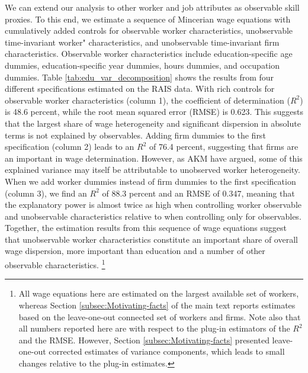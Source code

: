 We can extend our analysis to other worker and job attributes as observable skill proxies. To this end, we estimate a sequence of Mincerian wage equations with cumulatively added controls for observable worker characteristics, unobservable time-invariant worker" characteristics, and unobservable time-invariant firm characteristics. Observable worker characteristics include education-specific age dummies, education-specific year dummies, hours dummies, and occupation dummies. Table \ref{tab:edu_var_decomposition} shows the results from four different specifications estimated on the RAIS data. With rich controls for observable worker characteristics (column 1), the coefficient of determination ($R^2$) is 48.6 percent, while the root mean squared error (RMSE) is 0.623. This suggests that the largest share of wage heterogeneity and significant dispersion in absolute terms is not explained by observables. Adding firm dummies to the first specification (column 2) leads to an $R^2$ of 76.4 percent, suggesting that firms are an important in wage determination. However, as AKM have argued, some of this explained variance may itself be attributable to unobserved worker heterogeneity. When we add worker dummies instead of firm dummies to the first specification (column 3), we find an $R^2$ of 88.3 percent and an RMSE of 0.347, meaning that the explanatory power is almost twice as high when controlling worker observable and unobservable characteristics relative to when controlling only for observables. Together, the estimation results from this sequence of wage equations suggest that unobservable worker characteristics constitute an important share of overall wage dispersion, more important than education and a number of other observable characteristics.
%
\footnote{All wage equations here are estimated on the largest available set of workers, whereas Section \ref{subsec:Motivating-facts} of the main text reports estimates based on the leave-one-out connected set of workers and firms. Note also that all numbers reported here are with respect to the plug-in estimators of the $R^{2}$ and the RMSE. However, Section \ref{subsec:Motivating-facts} presented leave-one-out corrected estimates of variance components, which leads to small changes relative to the plug-in estimates.} %
%


